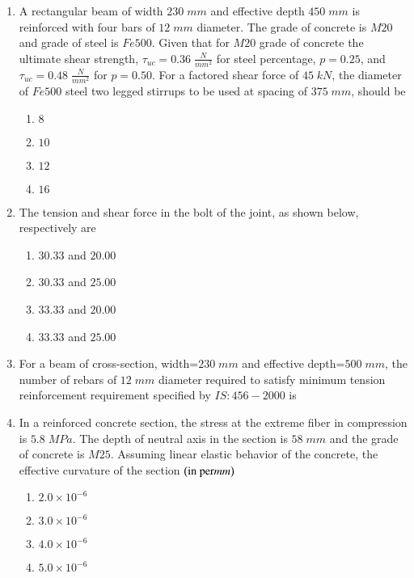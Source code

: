 \documentclass[journal,12pt,onecolumn]{IEEEtran}
\theoremstyle{remark}
\begin{document}
\begin{enumerate}[start=27]
\item A rectangular beam of width  $230\;mm$ and effective depth  $450\;mm$ is reinforced with four bars of $12\;mm$ diameter. The grade of concrete is $M20$ and grade of steel is $Fe500$. Given that for $M20$ grade of concrete the ultimate shear strength, $\tau_{uc}=0.36\;\frac{N}{mm^2}$ for steel percentage, $p=0.25$, and $\tau_{uc}=0.48\;\frac{N}{mm^2}$ for $p=0.50$. For a factored shear force of $45\;kN$, the diameter  of $Fe500$ steel two legged stirrups to be used at spacing of $375\;mm$, should be
\begin{enumerate}
    \item $8$
    \item $10$
    \item $12$
    \item $16$
\end{enumerate}
\item The tension and shear force  in the bolt of the joint, as shown below, respectively are
	
\begin{enumerate}
    \item $30.33$ and $20.00$
    \item $30.33$ and $25.00$
    \item $33.33$ and $20.00$
    \item $33.33$ and $25.00$
\end{enumerate}
\item For a beam of cross-section, width=$230\;mm$ and effective depth=$500\;mm$, the number of rebars of $12\;mm$ diameter required to satisfy 
minimum tension reinforcement requirement specified by $IS:456-2000$  is \underline{\hspace{2cm}}
\item In a reinforced concrete section, the stress at the extreme fiber in compression is $5.8\;MPa$. The depth of neutral axis in the section is $58\;mm$ and the grade of concrete is $M25$. Assuming linear elastic behavior of the concrete, the effective curvature of the section $\left(\text{in per}mm\right) $
\begin{enumerate}
    \item $2.0 \times 10^{-6}$
    \item $3.0 \times 10^{-6}$
    \item $4.0 \times 10^{-6}$
    \item $5.0 \times 10^{-6}$
\end{enumerate}

\end{enumerate}
\end{document}
